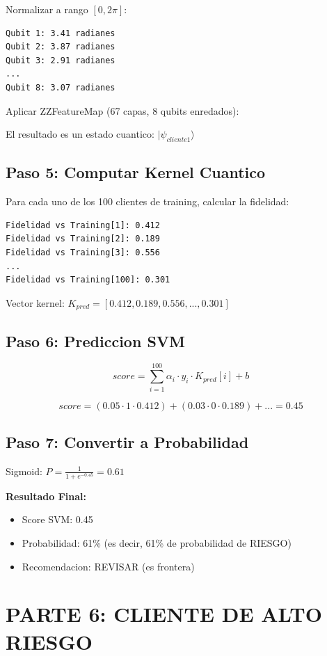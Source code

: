 \documentclass[11pt]{article}
\begin{document}
Normalizar a rango $[0, 2\pi]$:

\begin{verbatim}
Qubit 1: 3.41 radianes
Qubit 2: 3.87 radianes
Qubit 3: 2.91 radianes
...
Qubit 8: 3.07 radianes
\end{verbatim}

Aplicar ZZFeatureMap (67 capas, 8 qubits enredados):

El resultado es un estado cuantico: $|\psi_{cliente1}\rangle$

\subsection*{Paso 5: Computar Kernel Cuantico}

Para cada uno de los 100 clientes de training, calcular la fidelidad:

\begin{verbatim}
Fidelidad vs Training[1]: 0.412
Fidelidad vs Training[2]: 0.189
Fidelidad vs Training[3]: 0.556
...
Fidelidad vs Training[100]: 0.301
\end{verbatim}

Vector kernel: $K_{pred} = [0.412, 0.189, 0.556, ..., 0.301]$

\subsection*{Paso 6: Prediccion SVM}

$$score = \sum_{i=1}^{100} \alpha_i \cdot y_i \cdot K_{pred}[i] + b$$

$$score = (0.05 \cdot 1 \cdot 0.412) + (0.03 \cdot 0 \cdot 0.189) + ... = 0.45$$

\subsection*{Paso 7: Convertir a Probabilidad}

Sigmoid: $P = \frac{1}{1 + e^{-0.45}} = 0.61$

\textbf{Resultado Final:}
\begin{itemize}
\item Score SVM: 0.45
\item Probabilidad: 61\% (es decir, 61\% de probabilidad de RIESGO)
\item Recomendacion: REVISAR (es frontera)
\end{itemize}

\section*{PARTE 6: CLIENTE DE ALTO RIESGO}
\end{document}
